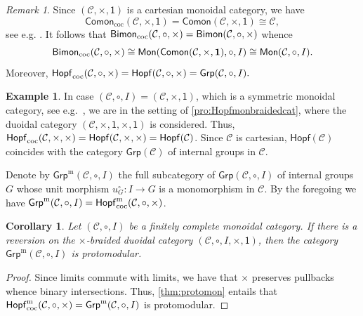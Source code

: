 \documentclass[nosumlimits,twoside]{amsart}
\newtheorem{corollary}[corollary]{\sc Corollary}
\theoremstyle{definition}
\newtheorem{example}[example]{\sc Example}
\theoremstyle{remark}
\newtheorem{remark}[remark]{\sc Remark}
\newenvironment{invisible}{{\noindent\sc \colorbox{yellow}{Invisible:}\;}\color{gray}}{\medskip}
\newcommand{\rd}[1]{{\color{red}{#1}}}
\newcommand{\as}[1]{{\color{blue}{#1}}}
\newcommand{\Cc}{\mathcal{C}}
\def\Hopfmon{{\sf Hopf}}
\def\cHopfmon{{\sf Hopf}_{\mathrm{coc}}}
\def\cBimon{{\sf Bimon}_{\mathrm{coc}}}
\def\terminal{\mathsf{1}}
\begin{document}
\begin{remark}%
\label{rmk:internalgroupduoidal}
Since $(\Cc,\times,\terminal)$ is a cartesian monoidal category, we have
\[\mathsf{Comon}_{\mathrm{coc}}(\Cc,\times,\terminal)=\mathsf{Comon}(\Cc,\times,\terminal)\cong \Cc,\] see e.g. \cite[Proposition 2.22]{Ulrich-Myriam}. It follows that $\cBimon(\Cc,\circ,\times)=\mathsf{Bimon}(\Cc,\circ,\times)$  whence
\[
\cBimon(\Cc,\circ,\times)\cong\mathsf{Mon}(\mathsf{Comon}(\Cc,\times,\mathbf{1}),\circ, I)\cong\mathsf{Mon}(\Cc,\circ,I).
\]
Moreover, $\cHopfmon(\Cc,\circ,\times)=\Hopfmon(\Cc,\circ,\times)=\mathsf{Grp}(\Cc,\circ,I).$
\end{remark}

\begin{example}%
\label{exa:usualGrp}
    In case $(\Cc,\circ,I)=(\Cc,\times,\terminal)$, which is a symmetric monoidal category, see e.g.\ \cite[Example 1.4]{Aguiar}, we are in the setting of \cref{pro:Hopfmonbraidedcat}, where the duoidal category $(\Cc,\times,\terminal,\times,\terminal)$ is considered. Thus, $\cHopfmon(\Cc,\times,\times)=\Hopfmon(\Cc,\times,\times)=\mathsf{Hopf}(\Cc)$. Since $\Cc$ is cartesian, $\mathsf{Hopf}(\Cc)$ coincides with the category $\mathsf{Grp}(\Cc)$ of internal groups in $\Cc$.
\end{example}

Denote by $\mathsf{Grp}^{\mathrm{m}}(\Cc,\circ,I)$ the full subcategory  of $\mathsf{Grp}(\Cc,\circ,I)$ of internal groups $G$ whose unit morphism $u_{G}^{\circ}:I\to G$ is a  monomorphism in $\Cc$. By the foregoing we have $\mathsf{Grp}^{\mathrm{m}}(\Cc,\circ,I)=\cHopfmon^{\mathrm{m}}(\Cc,\circ,\times)$.

\begin{corollary}%
\label{coro:Grproto}
Let $(\Cc,\circ,I)$ be a finitely complete monoidal category. If there is a reversion on the $\times$-braided duoidal category $(\Cc,\circ,I,\times,\terminal)$, then the category $\mathsf{Grp}^{\mathrm{m}}(\Cc,\circ,I)$ is protomodular.
\end{corollary}

\begin{proof} Since limits commute with limits, we have that $\times$ preserves pullbacks whence binary intersections. Thus, \cref{thm:protomon} entails that $\cHopfmon^{\mathrm{m}}(\Cc,\circ, \times)=\mathsf{Grp}^{\mathrm{m}}(\Cc,\circ,I)$ is protomodular.
\end{proof}

\end{document}
